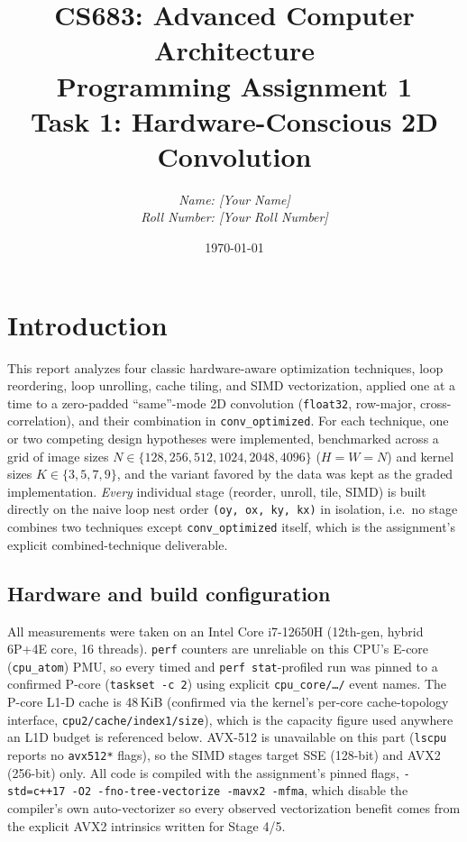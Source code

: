 \documentclass[11pt]{article}
\title{CS683: Advanced Computer Architecture \\ Programming Assignment 1 \\ \large Task 1: Hardware-Conscious 2D Convolution}
\author{\textit{Name: [Your Name]} \\ \textit{Roll Number: [Your Roll Number]}}
\date{\today}
\begin{document}
\maketitle

\section{Introduction}

This report analyzes four classic hardware-aware optimization techniques,
loop reordering, loop unrolling, cache tiling, and SIMD vectorization,
applied one at a time to a zero-padded ``same''-mode 2D convolution
(\texttt{float32}, row-major, cross-correlation), and their combination in
\texttt{conv\_optimized}. For each technique, one or two competing design
hypotheses were implemented, benchmarked across a grid of image sizes
$N \in \{128, 256, 512, 1024, 2048, 4096\}$ ($H=W=N$) and kernel sizes
$K \in \{3, 5, 7, 9\}$, and the variant favored by the data was kept as the
graded implementation. \emph{Every} individual stage (reorder, unroll, tile,
SIMD) is built directly on the naive loop nest order \texttt{(oy, ox, ky,
kx)} in isolation, i.e.\ no stage combines two techniques except
\texttt{conv\_optimized} itself, which is the assignment's explicit
combined-technique deliverable.

\subsection{Hardware and build configuration}
All measurements were taken on an Intel Core i7-12650H (12th-gen, hybrid
6P+4E core, 16 threads). \texttt{perf} counters are unreliable on this
CPU's E-core (\texttt{cpu\_atom}) PMU, so every timed and \texttt{perf
stat}-profiled run was pinned to a confirmed P-core (\texttt{taskset -c 2})
using explicit \texttt{cpu\_core/\ldots/} event names. The P-core L1-D cache
is 48\,KiB (confirmed via the kernel's per-core cache-topology interface,
\texttt{cpu2/cache/index1/size}), which is the capacity figure used anywhere an L1D
budget is referenced below. AVX-512 is unavailable on this part
(\texttt{lscpu} reports no \texttt{avx512*} flags), so the SIMD stages target
SSE (128-bit) and AVX2 (256-bit) only. All code is compiled with the
assignment's pinned flags, \texttt{-std=c++17 -O2 -fno-tree-vectorize
-mavx2 -mfma}, which disable the compiler's own auto-vectorizer so every
observed vectorization benefit comes from the explicit AVX2 intrinsics
written for Stage 4/5.
\end{document}
